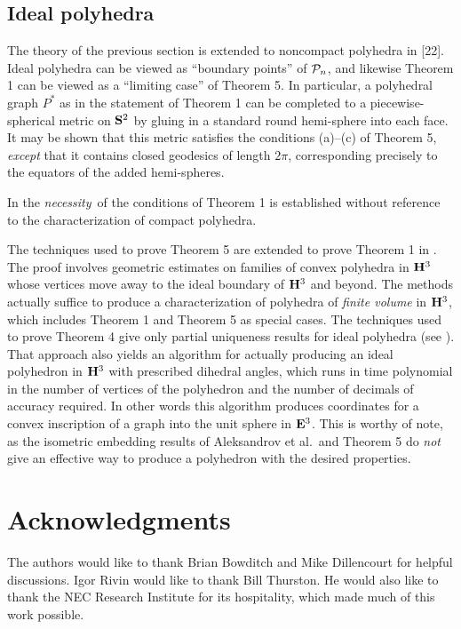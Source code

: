 \subsection{Ideal polyhedra}

The theory of the previous section is extended to noncompact
polyhedra in [22].
Ideal polyhedra can be viewed as ``boundary points'' of 
${\cal P}_n$, and
likewise Theorem 1 can be viewed as a ``limiting case'' of 
Theorem 5.
In particular, a polyhedral graph $P^*$ as in the 
statement of Theorem
1 can be completed to a piecewise-spherical metric on 
$\bold{S}^2$ by gluing
in a standard round hemi-sphere into each face. It may be
shown that this metric satisfies the conditions (a)--(c) 
of Theorem 5,
{\it except} that it contains closed geodesics of length 
$2\pi$,
corresponding precisely to the equators of the added 
hemi-spheres. 

\begin{Note}
In \cite{R1} the {\em necessity}\ of the conditions of 
Theorem 1 is
established without reference to the characterization of 
compact
polyhedra. 
\end{Note}

\medskip
The techniques used to
prove Theorem 5 are extended to prove Theorem 1 in
\cite{ri:ichar}. The proof involves geometric estimates on 
families of
convex polyhedra in $\bold{H}^3$ whose vertices move away to the 
ideal boundary of
$\bold{H}^3$ and beyond. The methods actually suffice to produce 
a characterization
of polyhedra of {\it finite volume} in $\bold{H}^3$, which 
includes Theorem 1
and Theorem 5 as special cases.
The techniques used to prove
Theorem 4 give only partial uniqueness results for ideal 
polyhedra
(see \cite{R1}). That approach also yields an
algorithm for actually producing an ideal polyhedron in 
$\bold{H}^3$ with
prescribed dihedral angles, which runs in time polynomial 
in the number of vertices of
the polyhedron and the number of decimals of accuracy 
required.
In other words this algorithm produces coordinates for a 
convex
inscription of a graph into the unit sphere in $\bold{E}^3$. 
This is worthy of note, as the isometric embedding results
of Aleksandrov et al.\ and Theorem 5  
do {\it not} give an effective way to produce a polyhedron
with the desired properties.

\section{Acknowledgments}

The authors would like to thank Brian Bowditch and Mike 
Dillencourt
for helpful discussions. Igor Rivin would like to thank 
Bill Thurston.
He would also like to thank the NEC Research Institute for 
its
hospitality, which made much of this work possible.

